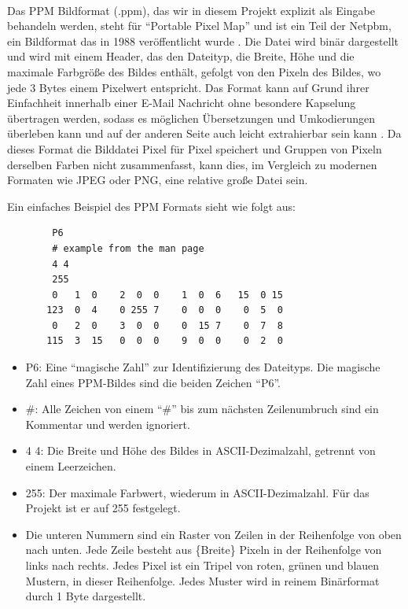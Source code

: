 \documentclass[course=erap]{aspdoc}
\begin{document}
\paragraph{}
Das PPM Bildformat (.ppm), das wir in diesem Projekt explizit als Eingabe behandeln werden, steht für \enquote{Portable Pixel Map} 
und ist ein Teil der Netpbm, ein Bildformat das in 1988  veröffentlicht wurde \cite{NetpbmHistory}. Die Datei wird binär dargestellt und wird mit einem Header, 
das den Dateityp, die Breite, Höhe und die maximale Farbgröße des Bildes enthält, gefolgt von den Pixeln des Bildes, wo jede 3 Bytes einem 
Pixelwert entspricht. Das Format kann auf Grund ihrer Einfachheit innerhalb einer E-Mail Nachricht ohne besondere Kapselung übertragen werden,
sodass es möglichen Übersetzungen und Umkodierungen überleben kann und auf der anderen Seite auch leicht extrahierbar sein kann \cite{netpbmFormatSpecification}. 
Da dieses Format die Bilddatei Pixel für Pixel speichert und Gruppen von Pixeln derselben Farben nicht zusammenfasst, kann dies, 
im Vergleich zu modernen Formaten wie JPEG oder PNG, eine relative große Datei sein. 

Ein einfaches Beispiel des PPM Formats sieht wie folgt aus: \newline

\begin{center}
    \begin{verbatim}
        P6  
        # example from the man page
        4 4
        255
        0   1  0    2  0  0    1  0  6   15  0 15
       123  0  4    0 255 7    0  0  0    0  5  0
        0   2  0    3  0  0    0  15 7    0  7  8
       115  3  15   0  0  0    9  0  0    0  2  0
    \end{verbatim}
\end{center} 

\begin{itemize}
    \item P6: Eine \enquote{magische Zahl} zur Identifizierung des Dateityps. Die magische Zahl eines PPM-Bildes sind die beiden 
    Zeichen \enquote{P6}.
    \item \#: Alle Zeichen von einem \enquote{\#} bis zum nächsten Zeilenumbruch sind ein Kommentar und werden ignoriert.
    \item 4 4: Die Breite und Höhe des Bildes in ASCII-Dezimalzahl, getrennt von einem Leerzeichen.
    \item 255: Der maximale Farbwert, wiederum in ASCII-Dezimalzahl. Für das Projekt ist er auf 255 festgelegt.
    \item Die unteren Nummern sind ein Raster von Zeilen in der Reihenfolge von oben nach unten. Jede Zeile besteht aus \{Breite\} 
    Pixeln in der Reihenfolge von links nach rechts. Jedes Pixel ist ein Tripel von roten, grünen und blauen Mustern, in dieser Reihenfolge. Jedes Muster wird in reinem Binärformat durch 1 Byte dargestellt.
\end{itemize}
\end{document}
